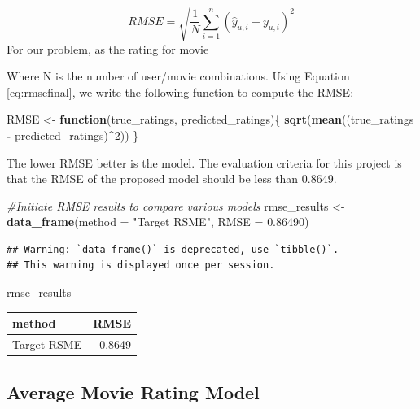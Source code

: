 \documentclass[]{article}
\newenvironment{Shaded}{\begin{snugshade}}{\end{snugshade}}
\newcommand{\CommentTok}[1]{\textcolor[rgb]{0.56,0.35,0.01}{\textit{#1}}}
\newcommand{\ControlFlowTok}[1]{\textcolor[rgb]{0.13,0.29,0.53}{\textbf{#1}}}
\newcommand{\DataTypeTok}[1]{\textcolor[rgb]{0.13,0.29,0.53}{#1}}
\newcommand{\DecValTok}[1]{\textcolor[rgb]{0.00,0.00,0.81}{#1}}
\newcommand{\FloatTok}[1]{\textcolor[rgb]{0.00,0.00,0.81}{#1}}
\newcommand{\KeywordTok}[1]{\textcolor[rgb]{0.13,0.29,0.53}{\textbf{#1}}}
\newcommand{\NormalTok}[1]{#1}
\newcommand{\OperatorTok}[1]{\textcolor[rgb]{0.81,0.36,0.00}{\textbf{#1}}}
\newcommand{\StringTok}[1]{\textcolor[rgb]{0.31,0.60,0.02}{#1}}
\begin{document}
\begin{equation}
\label{eq:rmsefinal}
RMSE = \sqrt{\frac{1}{N}\displaystyle\sum_{i=1}^{n} (\hat{y}_{u,i}-y_{u,i})^{2}}
\end{equation}For our problem, as the rating for movie

Where N is the number of user/movie combinations. Using Equation
\ref{eq:rmsefinal}, we write the following function to compute the RMSE:

\begin{Shaded}
\begin{Highlighting}[]
\NormalTok{RMSE <-}\StringTok{ }\ControlFlowTok{function}\NormalTok{(true_ratings, predicted_ratings)\{}
  \KeywordTok{sqrt}\NormalTok{(}\KeywordTok{mean}\NormalTok{((true_ratings }\OperatorTok{-}\StringTok{ }\NormalTok{predicted_ratings)}\OperatorTok{^}\DecValTok{2}\NormalTok{))}
\NormalTok{\}}
\end{Highlighting}
\end{Shaded}

The lower RMSE better is the model. The evaluation criteria for this
project is that the RMSE of the proposed model should be less than
0.8649.

\begin{Shaded}
\begin{Highlighting}[]
\CommentTok{#Initiate RMSE results to compare various models}
\NormalTok{rmse_results <-}\StringTok{ }\KeywordTok{data_frame}\NormalTok{(}\DataTypeTok{method =} \StringTok{"Target RSME"}\NormalTok{, }\DataTypeTok{RMSE =} \FloatTok{0.86490}\NormalTok{)}
\end{Highlighting}
\end{Shaded}

\begin{verbatim}
## Warning: `data_frame()` is deprecated, use `tibble()`.
## This warning is displayed once per session.
\end{verbatim}

\begin{Shaded}
\begin{Highlighting}[]
\NormalTok{rmse_results}
\end{Highlighting}
\end{Shaded}

\begin{longtable}[]{@{}lr@{}}
\toprule
method & RMSE\tabularnewline
\midrule
\endhead
Target RSME & 0.8649\tabularnewline
\bottomrule
\end{longtable}

\subsection{Average Movie Rating Model}
\label{sec:am}
\end{document}
